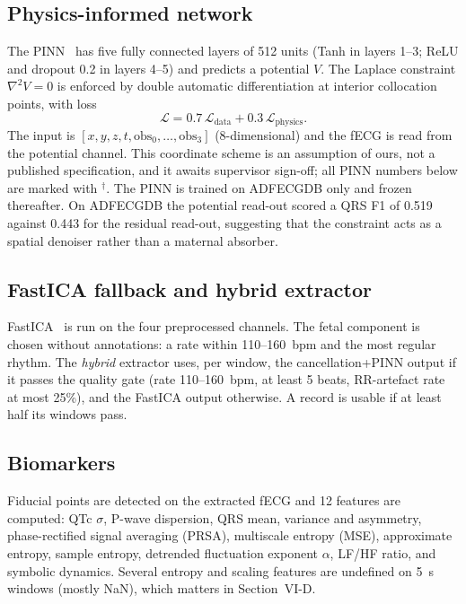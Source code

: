 \documentclass[journal]{IEEEtran}
\newcommand{\pinn}{$^{\dagger}$}
\begin{document}
\subsection{Physics-informed network}
The PINN~\cite{raissi2019} has five fully connected layers of 512 units (Tanh in layers 1--3; ReLU and dropout 0.2 in layers 4--5) and predicts a potential $V$. The Laplace constraint $\nabla^{2}V=0$ is enforced by double automatic differentiation at interior collocation points, with loss
\begin{equation}
\mathcal{L}=0.7\,\mathcal{L}_{\mathrm{data}}+0.3\,\mathcal{L}_{\mathrm{physics}}.
\end{equation}
The input is $[x,y,z,t,\mathrm{obs}_0,\ldots,\mathrm{obs}_3]$ (8-dimensional) and the fECG is read from the potential channel. This coordinate scheme is an assumption of ours, not a published specification, and it awaits supervisor sign-off; all PINN numbers below are marked with \pinn. The PINN is trained on ADFECGDB only and frozen thereafter. On ADFECGDB the potential read-out scored a QRS F1 of 0.519 against 0.443 for the residual read-out, suggesting that the constraint acts as a spatial denoiser rather than a maternal absorber.

\subsection{FastICA fallback and hybrid extractor}
FastICA~\cite{hyvarinen2000} is run on the four preprocessed channels. The fetal component is chosen without annotations: a rate within 110--160~bpm and the most regular rhythm. The \emph{hybrid} extractor uses, per window, the cancellation+PINN output if it passes the quality gate (rate 110--160~bpm, at least 5 beats, RR-artefact rate at most 25\%), and the FastICA output otherwise. A record is usable if at least half its windows pass.

\subsection{Biomarkers}
Fiducial points are detected on the extracted fECG and 12 features are computed: QTc $\sigma$, P-wave dispersion, QRS mean, variance and asymmetry, phase-rectified signal averaging (PRSA), multiscale entropy (MSE), approximate entropy, sample entropy, detrended fluctuation exponent $\alpha$, LF/HF ratio, and symbolic dynamics. Several entropy and scaling features are undefined on 5~s windows (mostly NaN), which matters in Section~VI-D.
\end{document}
